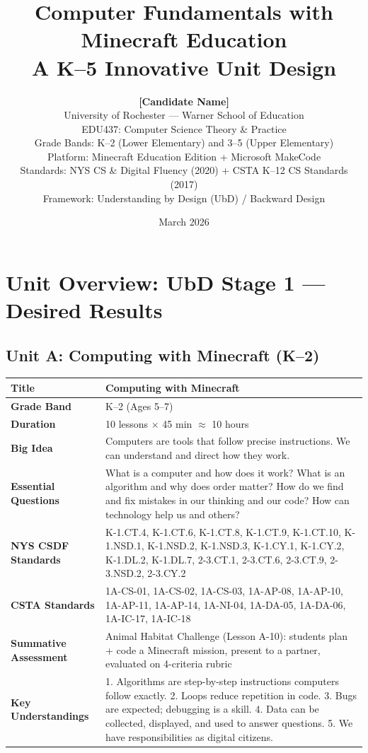 \documentclass[11pt,letterpaper]{article}
\title{%
  {\color{warnerTeal}\LARGE\bfseries Computer Fundamentals with Minecraft Education}\\[6pt]
  {\color{warnerTeal}\large A K--5 Innovative Unit Design}
}
\author{%
  \textbf{[Candidate Name]}\\[4pt]
  University of Rochester --- Warner School of Education\\
  EDU437: Computer Science Theory \& Practice\\[4pt]
  \small Grade Bands: K--2 (Lower Elementary) and 3--5 (Upper Elementary)\\
  \small Platform: Minecraft Education Edition + Microsoft MakeCode\\
  \small Standards: NYS CS \& Digital Fluency (2020) + CSTA K--12 CS Standards (2017)\\
  \small Framework: Understanding by Design (UbD) / Backward Design
}
\date{March 2026}
\begin{document}
\maketitle
\thispagestyle{empty}
\newpage

\tableofcontents
\newpage

\newpage
\section{Unit Overview: UbD Stage 1 --- Desired Results}
\label{sec:UnitOverviewUbDStage1DesiredResults}

\subsection{Unit A: Computing with Minecraft (K--2)}
\label{sub:UnitAComputingwithMinecraftK2}

\begin{longtable}{|L{0.28\textwidth}|L{0.65\textwidth}|}
\hline
\textbf{Title}  & Computing with Minecraft  \\
\hline
\textbf{Grade Band}  & K--2 (Ages 5--7)  \\
\hline
\textbf{Duration}  & 10 lessons $\times$ 45 min \ensuremath{\approx} 10 hours  \\
\hline
\textbf{Big Idea}  & Computers are tools that follow precise instructions. We can understand and direct how they work.  \\
\hline
\textbf{Essential Questions}  & What is a computer and how does it work? What is an algorithm and why does order matter? How do we find and fix mistakes in our thinking and our code? How can technology help us and others?  \\
\hline
\textbf{NYS CSDF Standards}  & K-1.CT.4, K-1.CT.6, K-1.CT.8, K-1.CT.9, K-1.CT.10, K-1.NSD.1, K-1.NSD.2, K-1.NSD.3, K-1.CY.1, K-1.CY.2, K-1.DL.2, K-1.DL.7, 2-3.CT.1, 2-3.CT.6, 2-3.CT.9, 2-3.NSD.2, 2-3.CY.2  \\
\hline
\textbf{CSTA Standards}  & 1A-CS-01, 1A-CS-02, 1A-CS-03, 1A-AP-08, 1A-AP-10, 1A-AP-11, 1A-AP-14, 1A-NI-04, 1A-DA-05, 1A-DA-06, 1A-IC-17, 1A-IC-18  \\
\hline
\textbf{Summative Assessment}  & Animal Habitat Challenge (Lesson A-10): students plan + code a Minecraft mission, present to a partner, evaluated on 4-criteria rubric  \\
\hline
\textbf{Key Understandings}  & 1. Algorithms are step-by-step instructions computers follow exactly. 2. Loops reduce repetition in code. 3. Bugs are expected; debugging is a skill. 4. Data can be collected, displayed, and used to answer questions. 5. We have responsibilities as digital citizens.  \\
\hline
\end{longtable}
\end{document}

